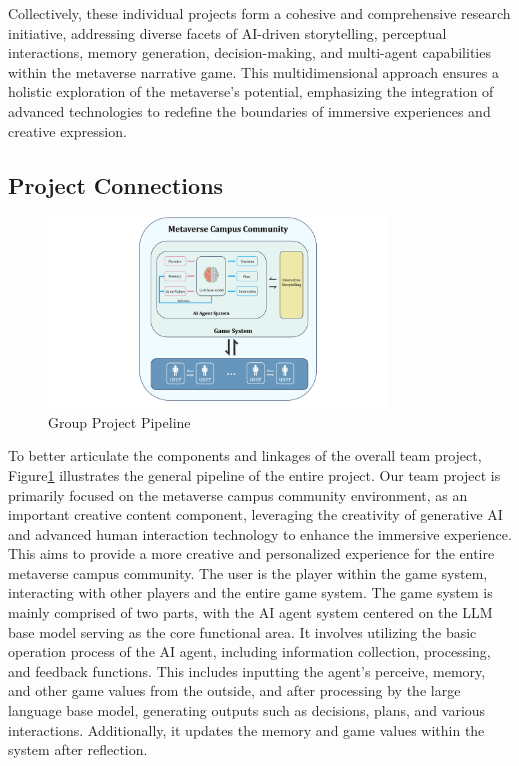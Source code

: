 Collectively, these individual projects form a cohesive and comprehensive research initiative, addressing diverse facets of AI-driven storytelling, perceptual interactions, memory generation, decision-making, and multi-agent capabilities within the metaverse narrative game. 
This multidimensional approach ensures a holistic exploration of the metaverse's potential, emphasizing the integration of advanced technologies to redefine the boundaries of immersive experiences and creative expression.


\subsection{Project Connections}
\begin{figure}
    \centering
    \includegraphics[width=0.8\textwidth]{image/Group-pipeline.pdf}
    \caption{Group Project Pipeline}
  \label{fig:Group_pipeline}
\end{figure}
To better articulate the components and linkages of the overall team project, 
Figure\ref{fig:Group_pipeline} illustrates the general pipeline of the entire project.
Our team project is primarily focused on the metaverse campus community environment, as an important creative content component, 
leveraging the creativity of generative AI and advanced human interaction technology to enhance the immersive experience. 
This aims to provide a more creative and personalized experience for the entire metaverse campus community. 
The user is the player within the game system, interacting with other players and the entire game system. 
The game system is mainly comprised of two parts, with the AI agent system centered on the LLM base model serving as the core functional area. 
It involves utilizing the basic operation process of the AI agent, including information collection, processing, and feedback functions. 
This includes inputting the agent's perceive, memory, and other game values from the outside, and after processing by the large language base model, 
generating outputs such as decisions, plans, and various interactions. 
Additionally, it updates the memory and game values within the system after reflection.

